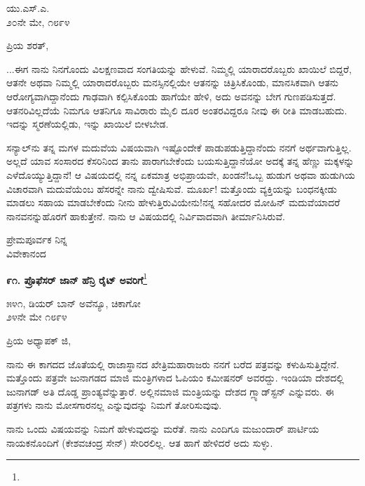 \begin{flushright}
ಯು.ಎಸ್.ಎ.\\೨೦ನೇ ಮೇ, ೧೮೯೪
\end{flushright}

\noindent
ಪ್ರಿಯ ಶರತ್,

...ಈಗ ನಾನು ನಿನಗೊಂದು ವಿಲಕ್ಷಣವಾದ ಸಂಗತಿಯನ್ನು ಹೇಳುವೆ. ನಿಮ್ಮಲ್ಲಿ ಯಾರಾದರೊಬ್ಬರು ಖಾಯಿಲೆ ಬಿದ್ದರೆ, ಆತನೇ ಅಥವಾ ನಿಮ್ಮಲ್ಲಿ ಯಾರಾದರೊಬ್ಬರು ಮನಸ್ಸಿನಲ್ಲಿಯೇ ಆತನನ್ನು ಚಿತ್ರಿಸಿಕೊಂಡು, ಮಾನಸಿಕವಾಗಿ ಆತನು ಆರೋಗ್ಯವಾಗಿದ್ದಾನೆಂದು ಗಾಢವಾಗಿ ಕಲ್ಪಿಸಿಕೊಂಡು ಹಾಗೆಯೇ ಹೇಳಿ, ಅದು ಅವನನ್ನು ಬೇಗ ಗುಣಪಡಿಸುತ್ತದೆ. ಆತನರಿವಿಲ್ಲದೆಯೆ ನಿಮಗೂ ಆತನಿಗೂ ಸಾವಿರಾರು ಮೈಲಿ ದೂರ ಅಂತರವಿದ್ದರೂ ನೀವು ಈ ರೀತಿ ಮಾಡಬಹುದು. ಇದನ್ನು ಸ್ಮರಣೆಯಲ್ಲಿಡು, ಇನ್ನು ಖಾಯಿಲೆ ಬೀಳಬೇಡ.

\vspace{0.2cm}

ಸನ್ಯಾಲ್‌ನು ತನ್ನ ಮಗಳ ಮದುವೆಯ ವಿಷಯವಾಗಿ ಇಷ್ಟೊಂದೇಕೆ ಪಾಡುಪಡುತ್ತಿದ್ದಾನೆಂದು ನನಗೆ ಅರ್ಥವಾಗುತ್ತಿಲ್ಲ. ಅಲ್ಲದೆ ಯಾವ ಸಂಸಾರದ ಕೆಸರಿನಿಂದ ತಾನು ಪಾರಾಗಬೇಕೆಂದು ಬಯಸುತ್ತಿದ್ದಾನೆಯೋ ಅದಕ್ಕೆ ತನ್ನ ಹೆಣ್ಣು ಮಕ್ಕಳನ್ನು ಎಳೆದೊಯ್ಯುತ್ತಿದ್ದಾನೆ! ಆ ವಿಷಯದಲ್ಲಿ ನನ್ನ ಏಕಮಾತ್ರ ಅಭಿಪ್ರಾಯವೇ, ಖಂಡನೆ!ಒಬ್ಬ ಹುಡುಗ ಅಥವಾ ಹುಡುಗಿಯ ವಿಚಾರವಾಗಿ ಮದುವೆಯೆಂಬ ಹೆಸರನ್ನೇ ನಾನು ದ್ವೇಷಿಸುವೆ. ಮೂರ್ಖ! ಮತ್ತೊಂದು ವ್ಯಕ್ತಿಯನ್ನು ಬಂಧನಕ್ಕೀಡು ಮಾಡಲು ಸಹಾಯ ಮಾಡಬೇಕೆಂದು ನೀನು ಹೇಳುತ್ತಿರುವಿಯೇನು!ನನ್ನ ಸಹೋದರ ಮೋಹಿನ್ ಮದುವೆಯಾದರೆ ನಾನವನನ್ನು\break ಹೊರಗೆ ಹಾಕುತ್ತೇನೆ. ನಾನು ಆ ವಿಷಯದಲ್ಲಿ ನಿರ್ವಿವಾದವಾಗಿ ತೀರ್ಮಾನಿಸಿರುವೆ.

{\flushright
ಪ್ರೇಮಪೂರ್ವಕ ನಿನ್ನ\\ವಿವೇಕಾನಂದ\par}

\newpage

\begin{center}
\textbf{೯೧. ಪ್ರೊಫೆಸರ್ ಜಾನ್ ಹೆನ್ರಿ ರೈಟ್ ಅವರಿಗೆ}\footnote{}
\end{center}

\begin{flushright}
೫೪೧, ಡಿಯರ್ ಬಾನ್ ಅವೆನ್ಯೂ, ಚಿಕಾಗೋ\\೨೪ನೇ ಮೇ ೧೮೯೪
\end{flushright}

\noindent
ಪ್ರಿಯ ಅಧ್ಯಾಪಕ್ ಜಿ,

ನಾನು ಈ ಕಾಗದದ ಜೊತೆಯಲ್ಲಿ ರಾಜಾಸ್ಥಾನದ ಖೇತ್ರಿಮಹಾರಾಜರು ನನಗೆ ಬರೆದ ಪತ್ರವನ್ನು ಕಳುಹಿಸುತ್ತಿದ್ದೇನೆ. ಮತ್ತೊಂದು ಪತ್ರವೇ ಜುನಾಗಡದ ಮಾಜಿ ಮಂತ್ರಿಗಳಾದ ಓಪಿಯಂ ಕಮೀಷನರ್ ಅವರದ್ದು. ಇಂಡಿಯಾ ದೇಶದಲ್ಲಿ ಜುನಾಗಡ್ ಅತಿ ದೊಡ್ಡ ಪ್ರಾಂತ್ಯವೆನ್ನುತ್ತಾರೆ. ಅಲ್ಲಿನಮಾಜಿ ಮಂತ್ರಿಯನ್ನು ದೇಶದ ಗ್ಲ್ಯಾಡ್‌ಸ್ಟನ್ ಎನ್ನುವರು. ಈ ಪತ್ರಗಳು ನಾನು ಮೋಸಗಾರನಲ್ಲ ಎನ್ನುವುದನ್ನು ನಿಮಗೆ ತೋರಿಸುವುವು.

ನಾನು ಒಂದು ವಿಷಯವನ್ನು ನಿಮಗೆ ಹೇಳುವುದನ್ನು ಮರೆತೆ. ನಾನು ಎಂದಿಗೂ ಮಜುಂದಾರ್ ಪಾರ್ಟಿಯ ನಾಯಕನೊಂದಿಗೆ (ಕೇಶವಚಂದ್ರ ಸೇನ್) ಸೇರಿರಲಿಲ್ಲ. ಆತ ಹಾಗೆ ಹೇಳಿದರೆ ಅದು ಸುಳ್ಳು.

